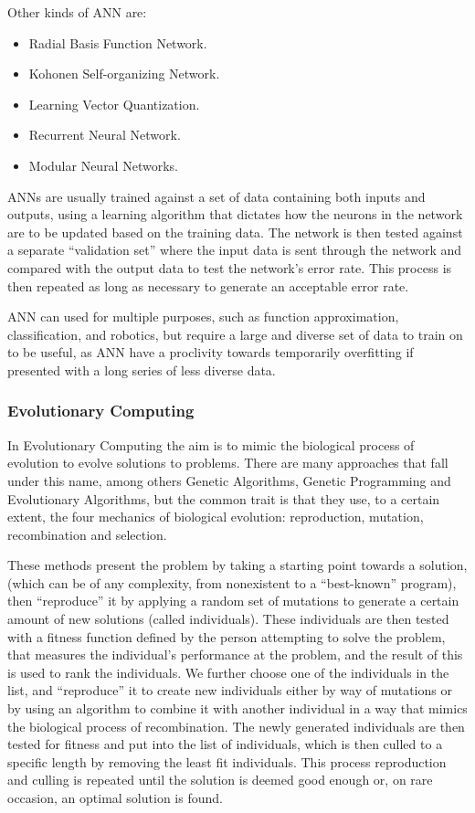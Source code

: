 \documentclass[]{report}
\begin{document}
Other kinds of ANN are:
\begin{itemize}
\item Radial Basis Function Network.
\item Kohonen Self-organizing Network.
\item Learning Vector Quantization.
\item Recurrent Neural Network.
\item Modular Neural Networks.
\end{itemize}

ANNs are usually trained against a set of data containing both inputs and
outputs, using a learning algorithm that dictates how the neurons in the network
are to be updated based on the training data. The network is then tested against
a separate ``validation set'' where the input data is sent through the network
and compared with the output data to test the network's error rate. This process
is then repeated as long as necessary to generate an acceptable error rate.

ANN can used for multiple purposes, such as function approximation,
classification, and robotics, but require a large and diverse set of data to
train on to be useful, as ANN have a proclivity towards temporarily overfitting
if presented with a long series of less diverse data.

\subsubsection{Evolutionary Computing}
\label{sec:evol-comp}

In Evolutionary Computing the aim is to mimic the biological process of
evolution to evolve solutions to problems. There are many approaches that fall
under this name, among others Genetic Algorithms, Genetic Programming and
Evolutionary Algorithms, but the common trait is that they use, to a certain
extent, the four mechanics of biological evolution: reproduction, mutation,
recombination and selection.

These methods present the problem by taking a starting point towards a solution,
(which can be of any complexity, from nonexistent to a ``best-known'' program),
then ``reproduce'' it by applying a random set of mutations to generate a
certain amount of new solutions (called individuals). These individuals are then
tested with a fitness function defined by the person attempting to solve the
problem, that measures the individual's performance at the problem, and the
result of this is used to rank the individuals. We further choose one of the
individuals in the list, and ``reproduce'' it to create new individuals either
by way of mutations or by using an algorithm to combine it with another
individual in a way that mimics the biological process of recombination. The
newly generated individuals are then tested for fitness and put into the list of
individuals, which is then culled to a specific length by removing the least fit
individuals. This process reproduction and culling is repeated until the
solution is deemed good enough or, on rare occasion, an optimal solution is
found.
\end{document}
